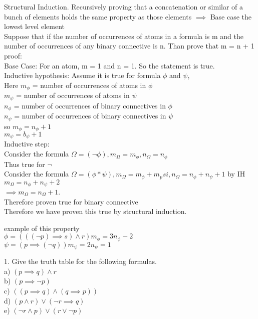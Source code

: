 \documentclass[12pt,oneside,fleqn]{article}
\theoremstyle{definition}
\begin{document}
Structural Induction.
Recursively proving that a concatenation or similar of a bunch of elements holds the same property as those elements $\implies$ Base case the lowest level element \\
Suppose that if the number of occurrences of atoms in a formula is m and the number of occurrences of any binary connective is n. Than prove that m = n + 1
proof: \\
Base Case: For an atom, m = 1 and n = 1. So the statement is true. \\
Inductive hypothesis: Assume it is true for formula $\phi$ and $\psi$, \\
Here $m_\phi$ = number of occurrences of atoms in $\phi$ \\
$m_\psi$ = number of occurrences of atoms in $\psi$ \\
$n_\phi$ = number of occurrences of binary connectives in $\phi$ \\
$n_\psi$ = number of occurrences of binary connectives in $\psi$ \\
so $m_\phi = n_\phi + 1$ \\
$m_\psi = b_\psi + 1$ \\
Inductive step: \\
Consider the formula $\Omega = (\neg \phi), m_\Omega = m_\phi, n_\Omega = n_\phi$ \\
Thus true for $\neg$ \\
Consider the formula $\Omega = (\phi * \psi), m_\Omega = m_\phi + m_psi, n_\Omega = n_\phi + n_\psi + 1$ by IH \\
$m_\Omega = n_\phi + n_\psi + 2$ \\
$\implies m_\Omega = n_\Omega + 1$. \\
Therefore proven true for binary connective \\
Therefore we have proven this true by structural induction.

example of this property \\
$\phi = (((\neg p) \implies s) \land r) m_\phi = 3 n_\phi - 2$ \\
$\psi = (p \implies (\neg q)) m_\psi = 2 n_\psi = 1$

1. Give the truth table for the following formulas. \\
 a) $(p \implies q) \land r$ \\
b) $(p \implies \neg p)$ \\
c) $( (p \implies q) \land (q \implies p))$ \\
d) $(p \land r) \lor (\neg r \implies q)$ \\
e) $(\neg r \land p) \lor (r \lor \neg p)$ \\
\end{document}
